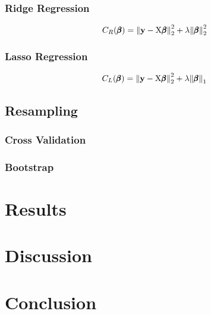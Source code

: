\documentclass[reprint, english, nofootinbib]{revtex4-2}
\begin{document}
        \subsubsection{Ridge Regression}
            \begin{equation}
                C_{R}(\pmb \beta)
                = \norm{\mathbf y - \textup{X}\pmb{\beta}}_2^2
                + \lambda \norm{\pmb{\beta}}_2^2
            \end{equation}
        \subsubsection{Lasso Regression}
            \begin{equation}
                C_L(\pmb \beta) =
                \norm{\mathbf y - \textup{X}\pmb{\beta}}_2^2
                + \lambda\norm{\pmb{\beta}}_1
            \end{equation}
    \subsection{Resampling}
        \subsubsection{Cross Validation}
        \subsubsection{Bootstrap}
\section{Results}
    \blindtext

\section{Discussion}
    \blindtext

\section{Conclusion}
    \blindtext

\onecolumngrid

\newpage
\twocolumngrid
\appendix
\end{document}
